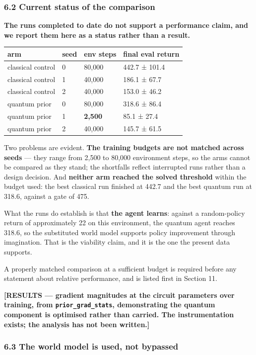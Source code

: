 \documentclass[
  11pt]{article}
\begin{document}
\hypertarget{current-status-of-the-comparison}{%
\subsubsection{6.2 Current status of the
comparison}\label{current-status-of-the-comparison}}

\textbf{The runs completed to date do not support a performance claim,
and we report them here as a status rather than a result.}

\begin{longtable}[]{@{}llll@{}}
\toprule
arm & seed & env steps & final eval return\tabularnewline
\midrule
\endhead
classical control & 0 & 80,000 & 442.7 ± 101.4\tabularnewline
classical control & 1 & 40,000 & 186.1 ± 67.7\tabularnewline
classical control & 2 & 40,000 & 153.0 ± 46.2\tabularnewline
quantum prior & 0 & 80,000 & 318.6 ± 86.4\tabularnewline
quantum prior & 1 & \textbf{2,500} & 85.1 ± 27.4\tabularnewline
quantum prior & 2 & 40,000 & 145.7 ± 61.5\tabularnewline
\bottomrule
\end{longtable}

Two problems are evident. \textbf{The training budgets are not matched
across seeds} --- they range from 2,500 to 80,000 environment steps, so
the arms cannot be compared as they stand; the shortfalls reflect
interrupted runs rather than a design decision. And \textbf{neither arm
reached the solved threshold} within the budget used: the best classical
run finished at 442.7 and the best quantum run at 318.6, against a gate
of 475.

What the runs do establish is that \textbf{the agent learns}: against a
random-policy return of approximately 22 on this environment, the
quantum agent reaches 318.6, so the substituted world model supports
policy improvement through imagination. That is the viability claim, and
it is the one the present data supports.

A properly matched comparison at a sufficient budget is required before
any statement about relative performance, and is listed first in Section
11.

\textbf{{[}RESULTS --- gradient magnitudes at the circuit parameters
over training, from \texttt{prior\_grad\_stats}, demonstrating the
quantum component is optimised rather than carried. The instrumentation
exists; the analysis has not been written.{]}}

\hypertarget{the-world-model-is-used-not-bypassed}{%
\subsubsection{6.3 The world model is used, not
bypassed}\label{the-world-model-is-used-not-bypassed}}
\end{document}
